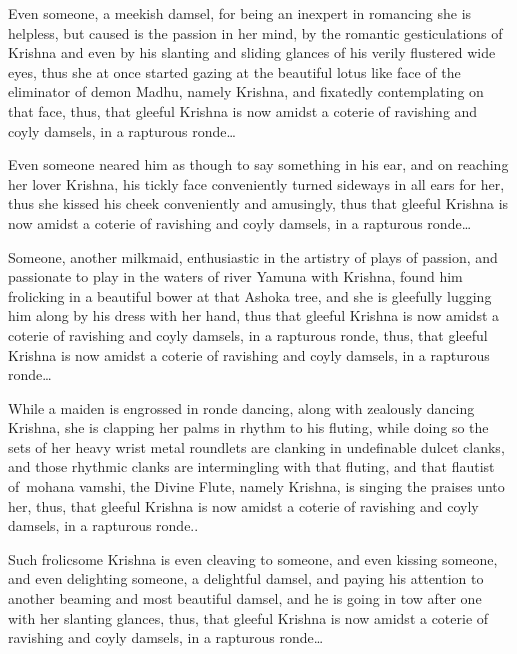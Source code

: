 \begin{myquote}
Even someone, a meekish damsel, for being an inexpert in romancing she is helpless, but caused is the passion in her mind, by the romantic gesticulations of Krishna and even by his slanting and sliding glances of his verily flustered wide eyes, thus she at once started gazing at the beautiful lotus like face of the eliminator of demon Madhu, namely Krishna, and fixatedly contemplating on that face, thus, that gleeful Krishna is now amidst a coterie of ravishing and coyly damsels, in a rapturous ronde…
\end{myquote}

\begin{myquote}
Even someone neared him as though to say something in his ear, and on reaching her lover Krishna, his tickly face conveniently turned sideways in all ears for her, thus she kissed his cheek conveniently and amusingly, thus that gleeful Krishna is now amidst a coterie of ravishing and coyly damsels, in a rapturous ronde…
\end{myquote}

\begin{myquote}
Someone, another milkmaid, enthusiastic in the artistry of plays of passion, and passionate to play in the waters of river Yamuna with Krishna, found him frolicking in a beautiful bower at that Ashoka tree, and she is gleefully lugging him along by his dress with her hand, thus that gleeful Krishna is now amidst a coterie of ravishing and coyly damsels, in a rapturous ronde, thus, that gleeful Krishna is now amidst a coterie of ravishing and coyly damsels, in a rapturous ronde…
\end{myquote}

\begin{myquote}
While a maiden is engrossed in ronde dancing, along with zealously dancing Krishna, she is clapping her palms in rhythm to his fluting, while doing so the sets of her heavy wrist metal roundlets are clanking in undefinable dulcet clanks, and those rhythmic clanks are intermingling with that fluting, and that flautist of mohana vamshi, the Divine Flute, namely Krishna, is singing the praises unto her, thus, that gleeful Krishna is now amidst a coterie of ravishing and coyly damsels, in a rapturous ronde..
\end{myquote}

\begin{myquote}
Such frolicsome Krishna is even cleaving to someone, and even kissing someone, and even delighting someone, a delightful damsel, and paying his attention to another beaming and most beautiful damsel, and he is going in tow after one with her slanting glances, thus, that gleeful Krishna is now amidst a coterie of ravishing and coyly damsels, in a rapturous ronde…
\end{myquote}

